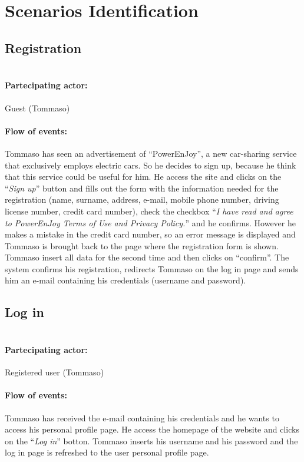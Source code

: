 \pagebreak
\section{Scenarios Identification}

\newcommand{\Scen}[2]{
    \paragraph{\\ Partecipating actor:} #1 
    \paragraph{Flow of events:} #2
}


\subsection{Registration}
 
\Scen{Guest (Tommaso)}{
	Tommaso has seen an advertisement of ``PowerEnJoy'', a new car-sharing service that exclusively employs electric cars. So he decides to sign up, because he think that this service could be useful for him.
    He access the site and clicks on the ``\textit{Sign up}'' button and fills out the form with the information needed for the registration (name, surname, address, e-mail, mobile phone number, driving license number, credit card number), check the checkbox ``\textit{I have read and agree to PowerEnJoy Terms of Use and Privacy Policy.}'' and he confirms.
    However he makes a mistake in the credit card number, so an error message is displayed and Tommaso is brought back to the page where the registration form is shown. Tommaso insert all data for the second time and then clicks on ``confirm''.
    The system confirms his registration, redirects Tommaso on the log in page and sends him an e-mail containing his credentials (username and password).
}


\subsection{Log in}

\Scen{Registered user (Tommaso)}{
	Tommaso has received the e-mail containing his credentials and he wants to access his personal profile page.
	He access the homepage of the website and clicks on the ``\textit{Log in}'' botton. 
	Tommaso inserts his username and his password and the log in page is refreshed to the user personal profile page.
}

